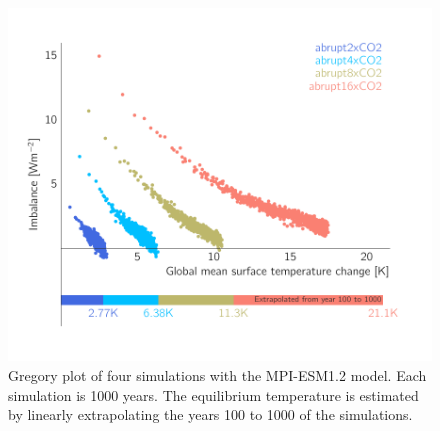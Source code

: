 \documentclass[12pt]{book}
\begin{document}
\begin{figure}
\begin{center}
\includegraphics[width=12 cm]{../external_figures/MPI-ESM12_gregory_plot.pdf}
\end{center}
\caption{ Gregory plot of four simulations with the MPI-ESM1.2 model. Each simulation is 1000 years. The equilibrium temperature is estimated by linearly extrapolating the years 100 to 1000 of the simulations. } 
\label{fig:mpiesm12_wide_range}
\end{figure}
\end{document}
